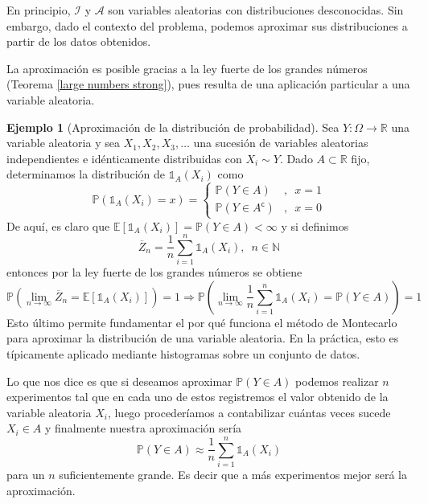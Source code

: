 \documentclass[11pt,a4paper]{book}
\theoremstyle{definition}%
\newtheorem{ejemplo}[teorema]{Ejemplo}
\newcommand{\setcomplement}{\mathsf{c}}
\newcommand{\Natural}{\mathbb{N}}
\newcommand{\EV}[1]{\mathbb{E}\left[#1\right]}
\newcommand{\Prob}[1]{\mathds{P}\left( #1 \right)}
\begin{document}
            En principio, $\mathcal{I}$ y $\mathcal{A}$ son variables aleatorias con distribuciones desconocidas. Sin embargo, dado el contexto del problema, podemos aproximar sus distribuciones a partir de los datos obtenidos.

            La aproximación es posible gracias a la ley fuerte de los grandes números (Teorema \ref{large numbers strong}), pues resulta de una aplicación particular a una variable aleatoria.

            \begin{ejemplo}[Aproximación de la distribución de probabilidad]\label{montecarlo dist prob}
                Sea $Y:\Omega\longrightarrow\mathbb{R}$ una variable aleatoria y sea $X_1,X_2,X_3,\ldots$ una sucesión de variables aleatorias independientes e idénticamente distribuidas con $X_i \sim Y$. Dado $A\subset \mathbb{R}$ fijo, determinamos la distribución de $\mathds{1}_A (X_i)$ como
                \begin{equation*}
                    \Prob{\mathds{1}_A (X_i) = x} = \left\{ \begin{array}{cl}
                         \Prob{Y \in A}&,\enspace x=1  \\
                         \Prob{Y \in A^\setcomplement}&,\enspace x=0
                    \end{array}\right.
                \end{equation*}
                De aquí, es claro que $\EV{\mathds{1}_A (X_i)}=\Prob{Y \in A}<\infty$ y si definimos
                \begin{equation*}
                    \overline{Z}_n = \frac{1}{n}\sum_{i=1}^n \mathds{1}_A (X_i),\enspace n \in\Natural
                \end{equation*}
                entonces por la ley fuerte de los grandes números se obtiene
                \begin{equation*}
                    \Prob{ \lim_{n \to \infty} \overline{Z}_{n} = \EV{\mathds{1}_A (X_i)}}= 1 \Longrightarrow \Prob{ \lim_{n \to \infty} \frac{1}{n}\sum_{i=1}^n \mathds{1}_A (X_i) = \Prob{Y \in A}}= 1
                \end{equation*}
                Esto último permite fundamentar el por qué funciona el método de Montecarlo para aproximar la distribución de una variable aleatoria. En la práctica, esto es típicamente aplicado mediante histogramas sobre un conjunto de datos.
                
                Lo que nos dice es que si deseamos aproximar $\Prob{Y \in A}$ podemos realizar $n$ experimentos tal que en cada uno de estos registremos el valor obtenido de la variable aleatoria $X_i$, luego procederíamos a contabilizar cuántas veces sucede $X_i\in A$ y finalmente nuestra aproximación sería 
                \begin{equation}\label{approx dist va montecarlo}
                    \Prob{Y \in A} \approx \frac{1}{n}\sum_{i=1}^n \mathds{1}_A (X_i)
                \end{equation}
                para un $n$ suficientemente grande. Es decir que a más experimentos mejor será la aproximación.
            \end{ejemplo}
\end{document}

